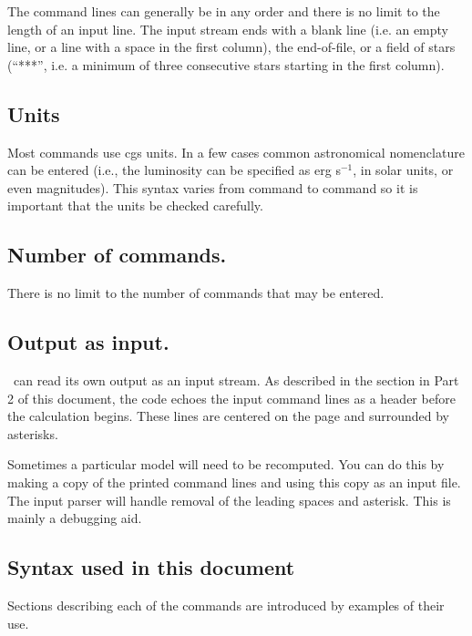 The command lines can generally be in any order and there is no limit to the length of an input line.
The input stream ends with a blank line
(i.e. an empty line, or a line with a space in the first column), the end-of-file,
or a field of stars (``***'', i.e. a minimum of three consecutive stars starting in the first column).

\subsection{Units}
Most commands use cgs units.
In a few cases common astronomical
nomenclature can be entered (i.e., the luminosity can be specified
as erg s$^{-1}$, in solar units, or even magnitudes).
This syntax varies from command
to command so it is important that the units be checked carefully.

\subsection{Number of commands.}
There is no limit to the number of commands that may be entered.

\subsection{Output as input.}  \Cloudy\ can read its own output
as an input stream.
As described in the section  in
Part 2 of this document, the code
echoes the input command lines as a header
before the calculation begins.
These lines are centered on the page and surrounded by asterisks.

Sometimes a particular model will need to be recomputed.  You can do
this by making a copy of the printed command lines and using this copy as
an input file.  The input parser will handle removal of the leading spaces
and asterisk.  This is mainly a debugging aid.

\subsection{Syntax used in this document}

Sections describing each of the commands are introduced
by examples of their use.

